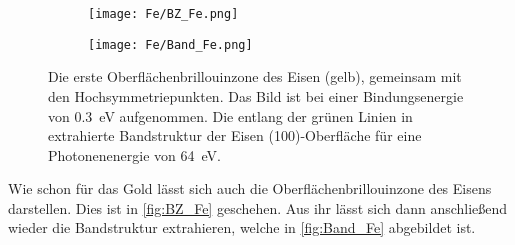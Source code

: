        \begin{figure}
            \begin{subfigure}[t]{0.34\textwidth}
                \centering
                \texttt{[image: Fe/BZ\_Fe.png]}
                \subcaption{}
                \label{fig:BZ_Fe}
            \end{subfigure}
            \begin{subfigure}[t]{0.62\textwidth}
                \centering
                \texttt{[image: Fe/Band\_Fe.png]}
                \subcaption{}
                \label{fig:Band_Fe}
            \end{subfigure}
            \caption{ Die erste Oberflächenbrillouinzone des Eisen (gelb), gemeinsam mit den Hochsymmetriepunkten. Das Bild ist bei einer Bindungsenergie von \SI{0.3}{\electronvolt} aufgenommen.
             Die entlang der grünen Linien in  extrahierte Bandstruktur der Eisen (100)-Oberfläche für eine Photonenenergie von \SI{64}{\electronvolt}.}
        \end{figure}
        Wie schon für das Gold lässt sich auch die Oberflächenbrillouinzone des Eisens darstellen. 
        Dies ist in \autoref{fig:BZ_Fe} geschehen.
        Aus ihr lässt sich dann anschließend wieder die Bandstruktur extrahieren, welche in \autoref{fig:Band_Fe} abgebildet ist.
        

